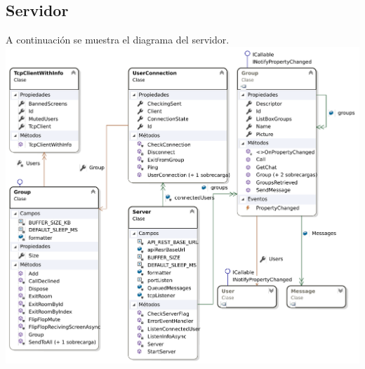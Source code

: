 \documentclass[12pt, a4paper]{book} %
\begin{document}
			\subsection{Servidor}
			A continuación se muestra el diagrama del servidor.\\
			\includegraphics[width=\textwidth,height=\textheight, keepaspectratio]{img/BacoServerDiagram.pdf}\\
\end{document}
